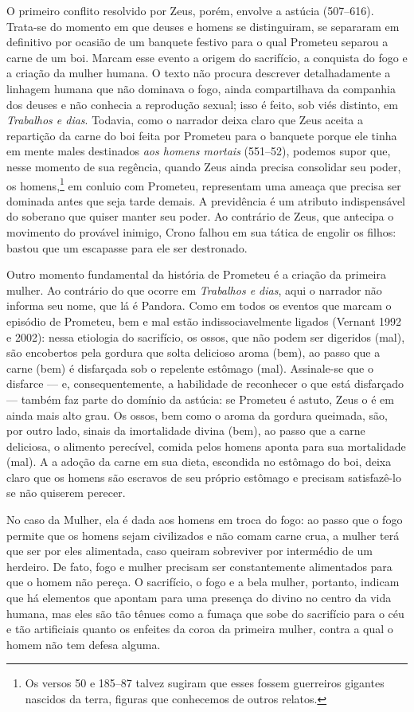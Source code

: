 O primeiro conflito resolvido por Zeus, porém, envolve a astúcia
(507--616). Trata-se do momento em que deuses e homens se distinguiram,
se separaram em definitivo por ocasião de um banquete festivo para o
qual Prometeu separou a carne de um boi. Marcam esse evento a origem do
sacrifício, a conquista do fogo e a criação da mulher humana. O texto
não procura descrever detalhadamente a linhagem humana que não dominava
o fogo, ainda compartilhava da companhia dos deuses e não conhecia a
reprodução sexual; isso é feito, sob viés distinto, em \textit{Trabalhos e
dias}. Todavia, como o narrador deixa claro que Zeus aceita a repartição
da carne do boi feita por Prometeu para o banquete porque ele tinha em
mente males destinados \textit{aos homens mortais} (551--52), podemos supor
que, nesse momento de sua regência, quando Zeus ainda precisa consolidar
seu poder, os homens,\footnote{Os versos 50 e 185--87 talvez sugiram que esses
fossem guerreiros gigantes nascidos da terra, figuras que conhecemos de
outros relatos.} em conluio com Prometeu, representam uma ameaça que
precisa ser dominada antes que seja tarde demais. A previdência é um
atributo indispensável do soberano que quiser manter seu poder. Ao
contrário de Zeus, que antecipa o movimento do provável inimigo, Crono
falhou em sua tática de engolir os filhos: bastou que um escapasse para
ele ser destronado.

Outro momento fundamental da história de Prometeu é a criação da
primeira mulher. Ao contrário do que ocorre em \textit{Trabalhos e dias},
aqui o narrador não informa seu nome, que lá é Pandora. Como em todos os
eventos que marcam o episódio de Prometeu, bem e mal estão
indissociavelmente ligados (Vernant 1992 e 2002): nessa etiologia do
sacrifício, os ossos, que não podem ser digeridos (mal), são encobertos
pela gordura que solta delicioso aroma (bem), ao passo que a carne (bem)
é disfarçada sob o repelente estômago (mal). Assinale-se que o disfarce
--- e, consequentemente, a habilidade de reconhecer o que está disfarçado
--- também faz parte do domínio da astúcia: se Prometeu é astuto, Zeus o
é em ainda mais alto grau. Os ossos, bem como o aroma da gordura
queimada, são, por outro lado, sinais da imortalidade divina (bem), ao
passo que a carne deliciosa, o alimento perecível, comida pelos homens
aponta para sua mortalidade (mal). A a adoção da carne em sua dieta,
escondida no estômago do boi, deixa claro que os homens são escravos de
seu próprio estômago e precisam satisfazê-lo se não quiserem perecer.

No caso da Mulher, ela é dada aos homens em troca do fogo: ao passo que
o fogo permite que os homens sejam civilizados e não comam carne crua, a
mulher terá que ser por eles alimentada, caso queiram sobreviver por
intermédio de um herdeiro. De fato, fogo e mulher precisam ser
constantemente alimentados para que o homem não pereça. O sacrifício, o
fogo e a bela mulher, portanto, indicam que há elementos que apontam
para uma presença do divino no centro da vida humana, mas eles são tão
tênues como a fumaça que sobe do sacrifício para o céu e tão artificiais
quanto os enfeites da coroa da primeira mulher, contra a qual o homem
não tem defesa alguma.

